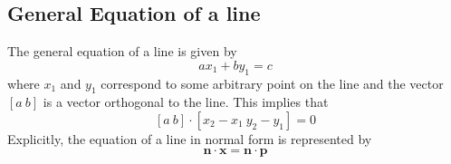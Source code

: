 \documentclass{report}
\theoremstyle{definition}
\begin{document}
    \subsection*{General Equation of a line}
        The general equation of a line is given by
        \[
            ax_1 + by_1 = c
        \]
        where $ x_1 $ and $ y_1 $ correspond to some arbitrary point on the line
        and the vector $ \left[ a \ b \right] $  is a vector orthogonal to the line. This implies that 
        \[
            \left[ a \ b \right] \cdot \left[ x_2 - x_1 \ y_2 - y_1 \right] = 0 
        \]   
        \noindent Explicitly, the equation of a line in normal form is represented by 
        \[
            \mathbf{n} \cdot \mathbf{x} = \mathbf{n} \cdot \mathbf{p} 
        \]
\end{document}

